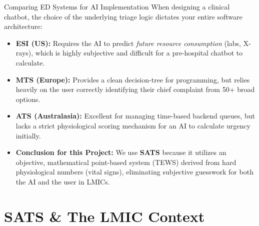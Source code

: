 \documentclass[aspectratio=169]{beamer}
\begin{document}
	\begin{frame}{Comparing ED Systems for AI Implementation}
		When designing a clinical chatbot, the choice of the underlying triage logic dictates your entire software architecture:
		\vspace{0.2cm}
		\begin{itemize}
			\item \textbf{ESI (US):} Requires the AI to predict \textit{future resource consumption} (labs, X-rays), which is highly subjective and difficult for a pre-hospital chatbot to calculate.
			\item \textbf{MTS (Europe):} Provides a clean decision-tree for programming, but relies heavily on the user correctly identifying their chief complaint from 50+ broad options.
			\item \textbf{ATS (Australasia):} Excellent for managing time-based backend queues, but lacks a strict physiological scoring mechanism for an AI to calculate urgency initially.
			\item \textbf{Conclusion for this Project:} We use \textbf{SATS} because it utilizes an objective, mathematical point-based system (TEWS) derived from hard physiological numbers (vital signs), eliminating subjective guesswork for both the AI and the user in LMICs.
		\end{itemize}
	\end{frame}
	
	\section{SATS \& The LMIC Context}
	
\end{document}
